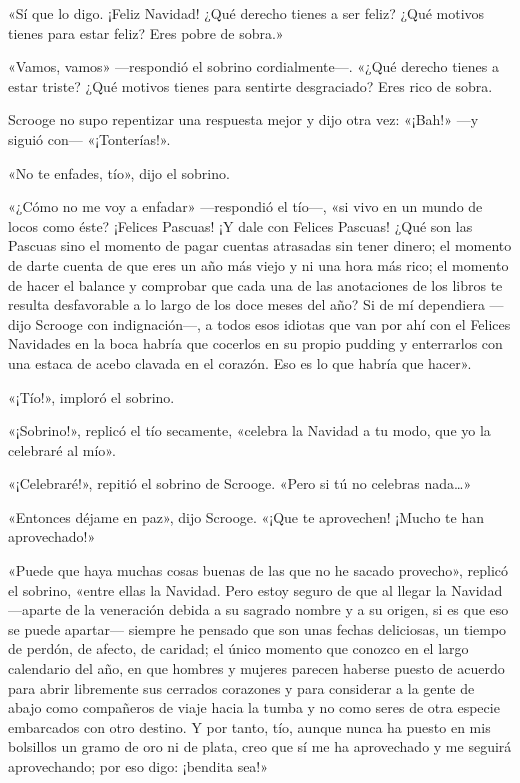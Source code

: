 \documentclass{novela}
\begin{document}
 «Sí que lo digo. ¡Feliz Navidad! ¿Qué derecho tienes a ser feliz? ¿Qué motivos tienes para estar feliz? Eres pobre de sobra.»

 «Vamos, vamos» ---respondió el sobrino cordialmente---. «¿Qué derecho tienes a estar triste? ¿Qué motivos tienes para sentirte desgraciado? Eres rico de sobra.

 Scrooge no supo repentizar una respuesta mejor y dijo otra vez: «¡Bah!» ---y siguió con--- «¡Tonterías!».

 «No te enfades, tío», dijo el sobrino.

 «¿Cómo no me voy a enfadar» ---respondió el tío---, «si vivo en un mundo de locos como éste? ¡Felices Pascuas! ¡Y dale con Felices Pascuas! ¿Qué son las Pascuas sino el momento de pagar cuentas atrasadas sin tener dinero; el momento de darte cuenta de que eres un año más viejo y ni una hora más rico; el momento de hacer el balance y comprobar que cada una de las anotaciones de los libros te resulta desfavorable a lo largo de los doce meses del año? Si de mí dependiera ---dijo Scrooge con indignación---, a todos esos idiotas que van por ahí con el Felices Navidades en la boca habría que cocerlos en su propio pudding y enterrarlos con una estaca de acebo clavada en el corazón. Eso es lo que habría que hacer».

 «¡Tío!», imploró el sobrino.

 «¡Sobrino!», replicó el tío secamente, «celebra la Navidad a tu modo, que yo la celebraré al mío».

 «¡Celebraré!», repitió el sobrino de Scrooge. «Pero si tú no celebras nada{\ldots}»

 «Entonces déjame en paz», dijo Scrooge. «¡Que te aprovechen! ¡Mucho te han aprovechado!»

 «Puede que haya muchas cosas buenas de las que no he sacado provecho», replicó el sobrino, «entre ellas la Navidad. Pero estoy seguro de que al llegar la Navidad ---aparte de la veneración debida a su sagrado nombre y a su origen, si es que eso se puede apartar--- siempre he pensado que son unas fechas deliciosas, un tiempo de perdón, de afecto, de caridad; el único momento que conozco en el largo calendario del año, en que hombres y mujeres parecen haberse puesto de acuerdo para abrir libremente sus cerrados corazones y para considerar a la gente de abajo como compañeros de viaje hacia la tumba y no como seres de otra especie embarcados con otro destino. Y por tanto, tío, aunque nunca ha puesto en mis bolsillos un gramo de oro ni de plata, creo que sí me ha aprovechado y me seguirá aprovechando; por eso digo: ¡bendita sea!»
\end{document}
